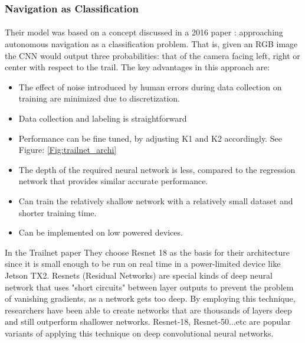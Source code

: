 \newpage
\subsubsection{Navigation as Classification}

\paragraph{}
Their model was based on a concept discussed in a 2016 paper %
: approaching autonomous navigation as a classification problem. That is, given an RGB image the CNN would output three probabilities: that of the camera facing left, right or center with respect to the trail. The key advantages in this approach are:

\begin{itemize}
    \item The effect of noise introduced by human errors during data collection on training are minimized due to discretization.
    \item Data collection and labeling is straightforward
    \item Performance can be fine tuned, by adjusting K1 and K2 accordingly. See Figure: \ref{Fig:trailnet_archi}
    \item The depth of the required neural network is less, compared to the regression network that provides similar accurate performance.
    \item Can train the relatively shallow network with a relatively small dataset and shorter training time.
    \item Can be implemented on low powered devices.
\end{itemize}

In the Trailnet paper %
They choose Resnet 18 as the basis for their architecture since it is small enough to be run on real time in a power-limited device like Jetson TX2. Resnets (Residual Networks) are special kinds of deep neural network that uses "short circuits" between layer outputs to prevent the problem of vanishing gradients, as a network gets too deep. By employing this technique, researchers have been able to create networks that are thousands of layers deep and still outperform shallower networks. Resnet-18, Resnet-50...etc are popular variants of applying this technique on deep convolutional neural networks.

